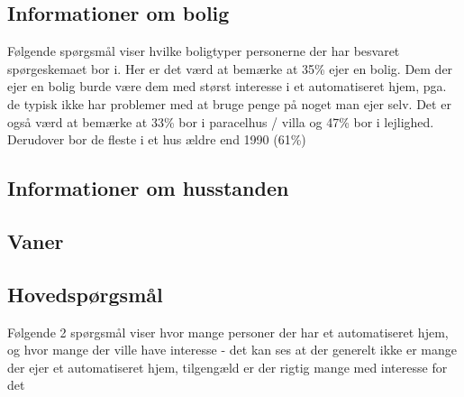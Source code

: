 \subsection*{Informationer om bolig}
Følgende spørgsmål viser hvilke boligtyper personerne der har besvaret spørgeskemaet bor i. Her er det værd at bemærke at 35\% ejer en bolig. Dem der ejer en bolig burde være dem med størst interesse i et automatiseret hjem, pga. de typisk ikke har problemer med at bruge penge på noget man ejer selv. Det er også værd at bemærke at 33\% bor i paracelhus / villa og 47\% bor i lejlighed. Derudover bor de fleste i et hus ældre end 1990 (61\%)\\
\clearpage
\subsection*{Informationer om husstanden}
\subsection*{Vaner}
\subsection*{Hovedspørgsmål}
Følgende 2 spørgsmål viser hvor mange personer der har et automatiseret hjem, og hvor mange der ville have interesse - det kan ses at der generelt ikke er mange der ejer et automatiseret hjem, tilgengæld er der rigtig mange med interesse for det\\
\clearpage

